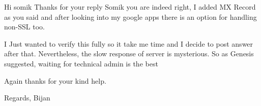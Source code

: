 Hi somik
Thanks for your reply
Somik you are indeed right, I added MX Record as you said and after looking into my google apps there is an option for handling non-SSL too.

I Just wanted to verify this fully so it take me time and I decide to post answer after that.
Nevertheless, the slow response of server is mysterious.
So as Genesis suggested, waiting for technical admin is the best

Again thanks for your kind help.

Regards,
Bijan
